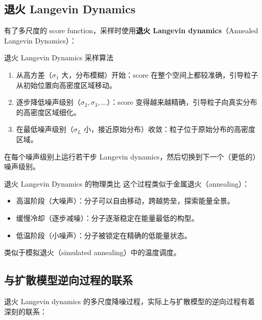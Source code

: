 \documentclass[a4paper]{article}
\begin{document}
\subsection{退火 Langevin Dynamics}

有了多尺度的 score function，采样时使用\textbf{退火 Langevin dynamics}（Annealed Langevin Dynamics）：

\begin{importantbox}{退火 Langevin Dynamics 采样算法}
\begin{enumerate}
    \item 从高方差（$\sigma_1$ 大，分布模糊）开始：score 在整个空间上都较准确，引导粒子从初始位置向高密度区域移动。
    \item 逐步降低噪声级别（$\sigma_2, \sigma_3, \ldots$）：score 变得越来越精确，引导粒子向真实分布的高密度区域细化。
    \item 在最低噪声级别（$\sigma_L$ 小，接近原始分布）收敛：粒子位于原始分布的高密度区域。
\end{enumerate}
在每个噪声级别上运行若干步 Langevin dynamics，然后切换到下一个（更低的）噪声级别。
\end{importantbox}

\begin{knowledgebox}{退火 Langevin Dynamics 的物理类比}
这个过程类似于金属退火（annealing）：
\begin{itemize}
    \item 高温阶段（大噪声）：分子可以自由移动，跨越势垒，探索能量全景。
    \item 缓慢冷却（逐步减噪）：分子逐渐稳定在能量最低的构型。
    \item 低温阶段（小噪声）：分子被锁定在精确的低能量状态。
\end{itemize}
类似于模拟退火（simulated annealing）中的温度调度。
\end{knowledgebox}

\subsection{与扩散模型逆向过程的联系}

退火 Langevin dynamics 的多尺度降噪过程，实际上与扩散模型的逆向过程有着深刻的联系：
\end{document}
